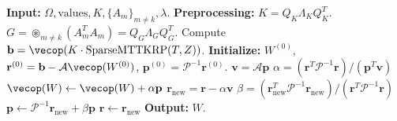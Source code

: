 \documentclass[11pt]{article}
\begin{document}
\begin{algorithm}[H]
\caption{PCG for RKHS-Constrained Mode-$k$ Update}
\begin{algorithmic}[1]
\STATE \textbf{Input:} $\Omega, \text{values}, K, \{A_m\}_{m \neq k}, \lambda$.
\STATE \textbf{Preprocessing:}
\STATE \quad $K = Q_K \Lambda_K Q_K^T$.
\STATE \quad $G = \mathop{\circledast}_{m \neq k} (A_m^T A_m) = Q_G \Lambda_G Q_G^T$.
\STATE \quad Compute $\mathbf{b} = \vecop(K \cdot \text{SparseMTTKRP}(T, Z))$.
\STATE \textbf{Initialize:} $W^{(0)}$, $\mathbf{r}^{(0)} = \mathbf{b} - \mathcal{A}\vecop(W^{(0)})$, $\mathbf{p}^{(0)} = \mathcal{P}^{-1} \mathbf{r}^{(0)}$.
    \STATE $\mathbf{v} = \mathcal{A} \mathbf{p}$ 
    \STATE $\alpha = (\mathbf{r}^T \mathcal{P}^{-1} \mathbf{r}) / (\mathbf{p}^T \mathbf{v})$
    \STATE $\vecop(W) \leftarrow \vecop(W) + \alpha \mathbf{p}$
    \STATE $\mathbf{r}_{\text{new}} = \mathbf{r} - \alpha \mathbf{v}$
    \STATE $\beta = (\mathbf{r}_{\text{new}}^T \mathcal{P}^{-1} \mathbf{r}_{\text{new}}) / (\mathbf{r}^T \mathcal{P}^{-1} \mathbf{r})$
    \STATE $\mathbf{p} \leftarrow \mathcal{P}^{-1} \mathbf{r}_{\text{new}} + \beta \mathbf{p}$
    \STATE $\mathbf{r} \leftarrow \mathbf{r}_{\text{new}}$
\ENDWHILE
\STATE \textbf{Output:} $W$.
\end{algorithmic}
\end{algorithm}
\end{document}

